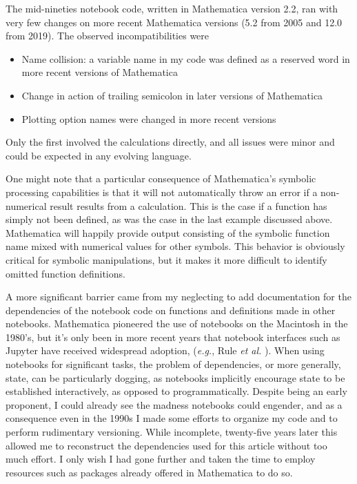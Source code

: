The mid-nineties notebook code, written in Mathematica version 2.2, ran with very few changes on more recent Mathematica versions  (5.2 from 2005 and 12.0 from 2019). The observed incompatibilities were
\begin{itemize}
\item Name collision: a variable name in my code was defined as a reserved word in more recent versions of Mathematica
\item Change in action of trailing semicolon in later versions of Mathematica
\item Plotting option names were changed in more recent versions
\end{itemize}
Only the first involved the calculations directly, and all issues were minor and could be expected in any evolving language.

One might note that a particular consequence of Mathematica's symbolic processing capabilities is that it will not automatically throw an error if a non-numerical result results from a calculation. This is the case if a function has simply not been defined, as was the case in the last example discussed above. Mathematica will happily provide output consisting of the symbolic function name mixed with numerical values for other symbols. This behavior is obviously critical for symbolic manipulations, but it makes it more difficult to identify omitted function definitions.
 
A more significant barrier came from my neglecting to add documentation for the dependencies of the notebook code on functions and definitions made in other notebooks. Mathematica pioneered the use of notebooks on the Macintosh in the 1980's, but it's only been in more recent years that notebook interfaces such as Jupyter have received widespread adoption, (\textit{e.g.}, Rule \textit{et al.} \supercite{Rule2019}). When using notebooks for significant tasks, the problem of dependencies, or more generally, state, can be particularly dogging, as notebooks implicitly encourage state to be established interactively, as opposed to programmatically. Despite being an early proponent, I could already see the madness notebooks could engender, and as a consequence even in the 1990s I made some efforts to organize my code and to perform rudimentary versioning. While incomplete, twenty-five years later this allowed me to reconstruct the dependencies used for this article without too much effort. I only wish I had gone further and taken the time to employ resources such as packages already offered in Mathematica to do so.

